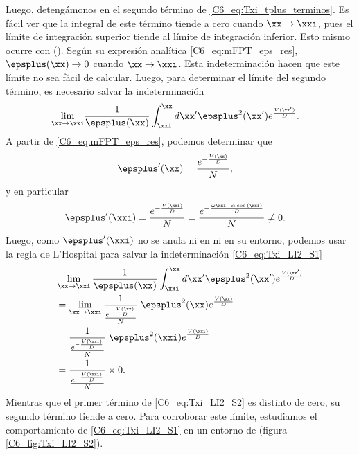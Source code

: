 {Luego, detengámonos en el segundo término de \ref{C6_eq:Txi_tplus_terminos}. Es fácil ver que la integral de este término tiende a cero cuando $\xx \rightarrow \xxi $, pues el límite de integración superior tiende al límite de integración inferior. Esto mismo ocurre con \epsplus(\xx). Según su expresión analítica \ref{C6_eq:mFPT_eps_res}, $\epsplus(\xx) \rightarrow 0$ cuando $\xx \rightarrow \xxi $. Esta indeterminación hacen que este límite no sea fácil de calcular. Luego, para determinar el límite del segundo término, es necesario salvar la indeterminación 
\begin{align}
      \lim_{\xx \rightarrow   \xxi }& \frac{1}{\epsplus(\xx)}  \int_{\xxi}^{\xx} d\xx'  \epsplus^2(\xx') e^{ \frac{V(\xx')}{D}}.
     \label{C6_eq:Txi_LI2_S1}
\end{align}
A partir de \ref{C6_eq:mFPT_eps_res}, podemos determinar que 
\begin{align}
     \epsplus'(\xx) & = \frac{e^{- \frac{V(\xx)}{D}}}{N},
\end{align}
y en particular 
\begin{align}
     \epsplus'(\xxi) & = \frac{e^{- \frac{V(\xxi)}{D}}}{N} = \frac{e^{- \frac{\omega \xxi - \alpha \cos{(\xxi)}}{D}}}{N} \neq 0.
\end{align}
Luego, como $\epsplus'(\xxi)$ no se anula ni en \xxi ni en su entorno, podemos usar la regla de L'Hospital para salvar la indeterminación \ref{C6_eq:Txi_LI2_S1}
\begin{align}
     & \lim_{\xx \rightarrow   \xxi } \frac{1}{\epsplus(\xx)}  \int_{\xxi}^{\xx} d\xx'  \epsplus^2(\xx') e^{ \frac{V(\xx')}{D}}\\
     & = \lim_{\xx \rightarrow   \xxi } \frac{1}{\frac{e^{- \frac{V(\xx)}{D}}}{N}}  \; \epsplus^2(\xx) e^{ \frac{V(\xx)}{D}} \\
     & = \frac{1}{\frac{e^{- \frac{V(\xxi)}{D}}}{N}}  \; \epsplus^2(\xxi) e^{ \frac{V(\xxi)}{D}} \\
     & = \frac{1}{\frac{e^{- \frac{V(\xxi)}{D}}}{N}}  \times 0. 
     \label{C6_eq:Txi_LI2_S2}
\end{align}
Mientras que el primer término de \ref{C6_eq:Txi_LI2_S2} es distinto de cero, su segundo término tiende a cero. Para corroborar este límite, estudiamos el comportamiento de \ref{C6_eq:Txi_LI2_S1} en un entorno de \xxi (figura \ref{C6_fig:Txi_LI2_S2}).

}
